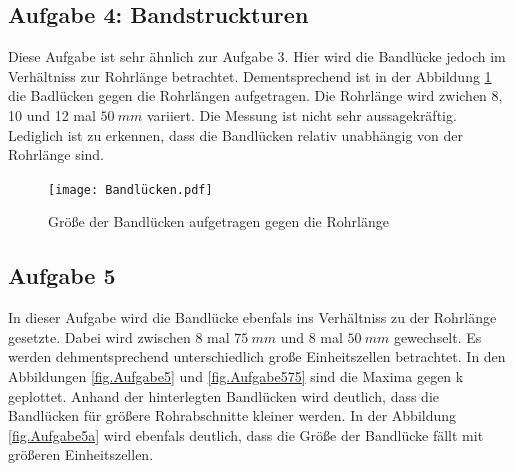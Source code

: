 \subsection{Aufgabe 4: Bandstruckturen}
Diese Aufgabe ist sehr ähnlich zur Aufgabe 3. Hier wird die Bandlücke jedoch im Verhältniss zur Rohrlänge betrachtet.
Dementsprechend ist in der Abbildung \ref{fig.Aufgabe4} die Badlücken gegen die Rohrlängen aufgetragen.
Die Rohrlänge wird zwichen 8, 10 und 12 mal $\SI{50}{mm}$ variiert.
Die Messung ist nicht sehr aussagekräftig.
Lediglich ist zu erkennen, dass die Bandlücken relativ unabhängig von der Rohrlänge sind.
\begin{figure}[h!]
  \centering
  \texttt{[image: Bandlücken.pdf]}
  \caption{Größe der Bandlücken aufgetragen gegen die Rohrlänge}
  \label{fig.Aufgabe4}
\end{figure}
\FloatBarrier

\subsection{Aufgabe 5}
In dieser Aufgabe wird die Bandlücke ebenfals ins Verhältniss zu der Rohrlänge gesetzte. Dabei wird zwischen 8 mal $\SI{75}{mm}$ und 8 mal $\SI{50}{mm}$ gewechselt.
Es werden dehmentsprechend unterschiedlich große Einheitszellen betrachtet.
In den Abbildungen \ref{fig.Aufgabe5} und \ref{fig.Aufgabe575} sind die Maxima gegen k geplottet. Anhand der hinterlegten Bandlücken wird deutlich, dass die Bandlücken für größere Rohrabschnitte kleiner werden.
In der Abbildung \ref{fig.Aufgabe5a} wird ebenfals deutlich, dass die Größe der Bandlücke fällt mit größeren Einheitszellen.

